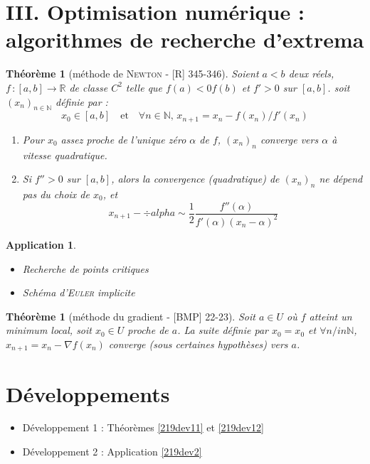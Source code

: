 \documentclass[10pt, a4paper, parskip=full, twoside, twocolumn]{report}
\newtheorem{theorem}[definition]{Théorème}
\newtheorem{application}[definition]{Application}
\newcommand{\IN}{\mathbb{N}}
\newcommand{\IR}{\mathbb{R}}
\begin{document}
\section*{III. Optimisation numérique : algorithmes de recherche d'extrema}
\begin{theorem}[méthode de \textsc{Newton} - \textnormal{[R] 345-346}]
	Soient $a < b$ deux réels, $f\,\colon[a,b]\to \IR$ de classe $C^2$ telle que $f(a)< 0 f(b)$ et $f'>0$ sur $[a,b]$.
	soit $\left(x_n\right)_{n\in\IN}$ définie par :
	$$x_0\in [a,b]\quad\text{et}\quad \forall n\in\IN,\, x_{n+1} = x_n - f(x_n)/f'(x_n)$$
	\begin{enumerate}
		\item Pour $x_0$ assez proche de l'unique zéro $\alpha$ de $f$, $\left(x_n\right)_n$ converge vers $\alpha$ à vitesse quadratique.
		\item Si $f''>0$ sur $[a,b]$, alors la convergence (quadratique) de $\left(x_n\right)_n$ ne dépend pas du choix de $x_0$, et $$x_{n+1} - ÷alpha \sim \frac{1}{2}\frac{f''(\alpha)}{f'(\alpha)(x_n-\alpha)^2}$$
	\end{enumerate}
\end{theorem}

\begin{application}
	\begin{itemize}
		\item Recherche de points critiques
		\item Schéma d'\textsc{Euler} implicite
	\end{itemize}
\end{application}

\begin{theorem}[méthode du gradient - \textnormal{[BMP] 22-23}]
	Soit $a\in U$ où $f$ atteint un minimum local, soit $x_0\in U$ proche de $a$.
	La suite définie par $x_0 = x_0$ et $\forall n/in \IN$, $x_{n+1} = x_n - \nabla f(x_n)$ converge (sous certaines hypothèses) vers $a$.
\end{theorem}

\section*{Développements}
\begin{itemize}
	\item Développement 1 : Théorèmes \ref{219dev11} et \ref{219dev12}
	\item Développement 2 : Application \ref{219dev2}
\end{itemize}
\end{document}
